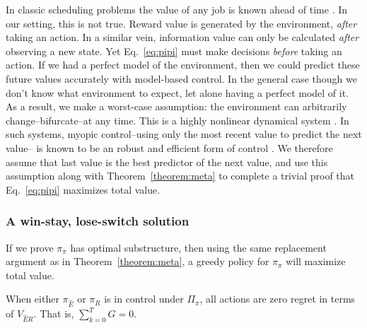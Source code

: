In classic scheduling problems the value of any job is known ahead of time \citep{Bellmann1954,Roughgarden2019}. In our setting, this is not true. Reward value is generated by the environment, \textit{after} taking an action. In a similar vein, information value can only be calculated \textit{after} observing a new state. Yet Eq.~\ref{eq:pipi} must make decisions \textit{before} taking an action. If we had a perfect model of the environment, then we could predict these future values accurately with model-based control. In the general case though we don't know what environment to expect, let alone having a perfect model of it. As a result, we make a worst-case assumption: the environment can arbitrarily change--bifurcate--at any time. This is a highly nonlinear dynamical system \citep{Strogatz1994}. In such systems, myopic control--using only the most recent value to predict the next value-- is known to be an robust and efficient form of control \citep{Hocker2019}. We therefore assume that last value is the best predictor of the next value, and use this assumption along with Theorem~\ref{theorem:meta} to complete a trivial proof that Eq.~\ref{eq:pipi} maximizes total value.

\subsubsection*{A win-stay, lose-switch solution}
If we prove $\pi_{\pi}$ has optimal substructure, then using the same replacement argument \citep{Roughgarden2019} as in Theorem~\ref{theorem:meta}, a greedy policy for $\pi_\pi$ will maximize total value.

\begin{theorem}
	\label{th:no_regret_ER}
	When either $\pi_{\hat E}$ or $\pi_R$ is in control under $\Pi_{\pi}$, all actions are zero regret in terms of $V_{\hat{E}R}$. That is, $\sum_{k=0}^{T} G = 0$.
\end{theorem}


    
